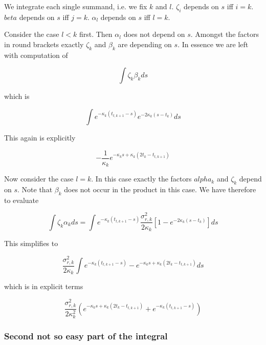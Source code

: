 \documentclass{amsart}
\theoremstyle{plain}
\numberwithin{equation}{section}
\begin{document}
We integrate each single summand, i.e. we fix $k$ and $l$. $\zeta_i$ depends on $s$ iff $i=k$. $beta$ depends on $s$ iff $j=k$. $\alpha_l$ depends
on $s$ iff $l=k$.

Consider the case $l<k$ first. Then $\alpha_l$ does not depend on $s$. Amongst the factors in round brackets exactly $\zeta_k$ and $\beta_k$ are depending on $s$. In essence we are left with computation of

\begin{equation}
\int \zeta_k \beta_k ds
\end{equation}

which is

\begin{equation}
\int e^{-\kappa_k(t_{t,k+1}-s)} e^{-2\kappa_k(s-t_k)} ds 
\end{equation}

This again is explicitly

\begin{equation}
-\frac{1}{\kappa_k}e^{-\kappa_ks+\kappa_k(2t_k-t_{t,k+1})}
\end{equation}

Now consider the case $l=k$. In this case exactly the factors $alpha_k$ and $\zeta_k$ depend on $s$. Note that $\beta_k$ does not occur in the product in this case. We have therefore to evaluate

\begin{equation}
\int \zeta_k \alpha_k ds = \int e^{-\kappa_k(t_{t,k+1}-s)} \frac{\sigma_{r,k}^2}{2\kappa_k}\left[1-e^{-2\kappa_k(s-t_k)}\right] ds
\end{equation}

This simplifies to

\begin{equation}
\frac{\sigma_{r,k}^2}{2\kappa_k} \int e^{-\kappa_k(t_{t,k+1}-s)} - e^{-\kappa_k s + \kappa_k ( 2t_k - t_{t,k+1} ) } ds
\end{equation}

which is in explicit terms

\begin{equation}
\frac{\sigma_{r,k}^2}{2\kappa_k^2} \left( e^{-\kappa_k s + \kappa_k ( 2t_k - t_{t,k+1} ) } + e^{-\kappa_k(t_{t,k+1}-s)} \right)
\end{equation}

\subsubsection{Second not so easy part of the integral} 
\end{document}
